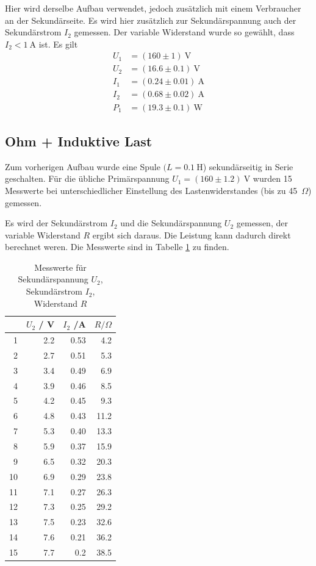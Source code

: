 \documentclass{article}
\newcommand{\W}{\text{W}}
\newcommand{\V}{\text{V}}
\newcommand{\A}{\text{A}}
\begin{document}
Hier wird derselbe Aufbau verwendet, jedoch zusätzlich mit einem Verbraucher an der Sekundärseite. Es wird hier zusätzlich zur Sekundärspannung auch der Sekundärstrom $I_2$ gemessen. Der variable Widerstand wurde so gewählt, dass $I_2 < 1~\A$ ist. Es gilt
\begin{align*}
U_1 &= (160 \pm 1)~\V \\
U_2 &= (16.6 \pm 0.1)~\V \\
I_1 &= (0.24 \pm 0.01)~\A \\
I_2 &= (0.68 \pm 0.02)~\A \\
P_1 &= (19.3\pm0.1)~\W
\end{align*}





\subsection{Ohm + Induktive Last}

Zum vorherigen Aufbau wurde eine Spule $(L=0.1~$H) sekundärseitig in Serie geschalten. Für die übliche Primärspannung $U_1 = (160\pm1.2)~\V$ wurden 15 Messwerte bei unterschiedlicher Einstellung des Lastenwiderstandes (bis zu 45~$\Omega$) gemessen. 

Es wird der Sekundärstrom $I_2$ und die Sekundärspannung $U_2$ gemessen, der variable Widerstand $R$ ergibt sich daraus. Die Leistung kann dadurch direkt berechnet weren. Die Messwerte sind in Tabelle \ref{tab:spule} zu finden.

\begin{table}[H]
\centering
\caption{Messwerte für Sekundärspannung $U_2$, Sekundärstrom $I_2$, Widerstand $R$}
\label{tab:spule}
\begin{tabular}{r|rrr}
  &	$U_2$ / V  &	$I_2$ /A  &	$R / \Omega$\\
  \hline
1 &	2.2	&0.53	&	4.2	 \\
2 &	2.7	&0.51	&	5.3	 \\
3 &	3.4	&0.49	&	6.9   \\
4 &	3.9	&0.46	&	8.5	  \\
5 &	4.2	&0.45	&	9.3	  \\
6 &	4.8	&0.43	&	11.2	  \\
7 &	5.3	&0.40	&   13.3  \\
8 &	5.9	&0.37	&	15.9	 \\
9 &	6.5	&0.32	&	20.3	 \\
10&	6.9	&0.29	&	23.8	 \\
11&	7.1	&0.27	&	26.3	  \\
12&	7.3	&0.25	&	29.2	  \\
13&	7.5	&0.23	&	32.6	 \\
14&	7.6	&0.21	&	36.2  \\
15&	7.7	&0.2		&   38.5 
\end{tabular}

\end{table}
\end{document}
